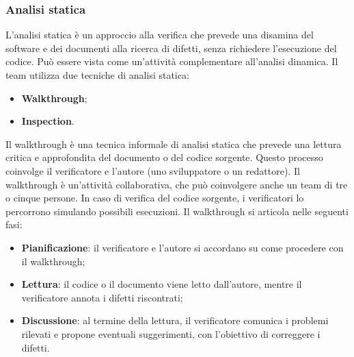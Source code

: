 \subsubsection{Analisi statica}
\par L’analisi statica è un approccio alla verifica che prevede una disamina del software e dei documenti alla ricerca di difetti, senza richiedere l’esecuzione del codice. Può essere vista come un’attività complementare all’analisi dinamica. Il team utilizza due tecniche di analisi statica:
\begin{itemize}
  \item \textbf{Walkthrough};
  \item \textbf{Inspection}.
\end{itemize}

\par Il walkthrough è una tecnica informale di analisi statica che prevede una lettura critica e approfondita del documento o del codice sorgente. Questo processo coinvolge il verificatore e l’autore (uno sviluppatore o un redattore). Il walkthrough è un'attività collaborativa, che può coinvolgere anche un team di tre o cinque persone. In caso di verifica del codice sorgente, i verificatori lo percorrono simulando possibili esecuzioni. Il walkthrough si articola nelle seguenti fasi:
\begin{itemize}
  \item \textbf{Pianificazione}: il verificatore e l'autore si accordano su come procedere con il walkthrough;
  \item \textbf{Lettura}: il codice o il documento viene letto dall'autore, mentre il verificatore annota i difetti riscontrati;
  \item \textbf{Discussione}: al termine della lettura, il verificatore comunica i problemi rilevati e propone eventuali suggerimenti, con l'obiettivo di correggere i difetti.
\end{itemize}

